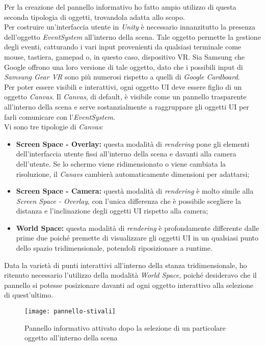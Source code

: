 Per la creazione del pannello informativo ho fatto ampio utilizzo di questa seconda tipologia di oggetti, trovandola adatta allo scopo. \\
Per costruire un'interfaccia utente in \textit{Unity} è necessario innanzitutto la presenza dell'oggetto \textit{EventSystem} all'interno della scena. Tale oggetto permette la gestione degli eventi, catturando i vari input provenienti da qualsiasi terminale come mouse, tastiera, gamepad o, in questo caso, dispositivo VR. Sia Samsung che Google offrono una loro versione di tale oggetto, dato che i possibili input di \textit{Samsung Gear VR} sono più numerosi rispetto a quelli di \textit{Google Cardboard}. \\
Per poter essere visibili e interattivi, ogni oggetto UI deve essere figlio di un oggetto \textit{Canvas}. Il \textit{Canvas}, di default, è visibile come un pannello trasparente all'interno della scena e serve sostanzialmente a raggruppare gli oggetti UI per farli comunicare con l'\textit{EventSystem}. \\
Vi sono tre tipologie di \textit{Canvas}:

\begin{itemize}
	\item \textbf{Screen Space - Overlay:} questa modalità di \textit{rendering} pone gli elementi dell'interfaccia utente fissi all'interno della scena e davanti alla camera dell'utente. Se lo schermo viene ridimensionato o viene cambiata la risoluzione, il \textit{Canavs} cambierà automaticamente dimensioni per adattarsi;
	\item \textbf{Screen Space - Camera:} questà modalità di \textit{rendering} è molto simile alla \textit{Screen Space - Overlay}, con l'unica differenza che è possibile scegliere la distanza e l'inclinazione degli oggetti UI rispetto alla camera;
	\item \textbf{World Space:} questa modalità di \textit{rendering} è profondamente differente dalle prime due poiché premette di visualizzare gli oggetti UI in un qualsiasi punto dello spazio tridimensionale, potendoli riposizionare a runtime.
\end{itemize}

Data la varietà di punti interattivi all'interno della stanza tridimensionale, ho ritenuto necessario l'utilizzo della modalità \textit{World Space}, poiché desideravo che il pannello si potesse posizionare davanti ad ogni oggetto interattivo alla selezione di quest'ultimo.

\label{Pannello informativo}
\begin{figure}[ht]
	\begin{center}
		\texttt{[image: pannello-stivali]}
		\caption{Pannello informativo attivato dopo la selezione di un particolare oggetto all'interno della scena}
	\end{center}
\end{figure}
\FloatBarrier

